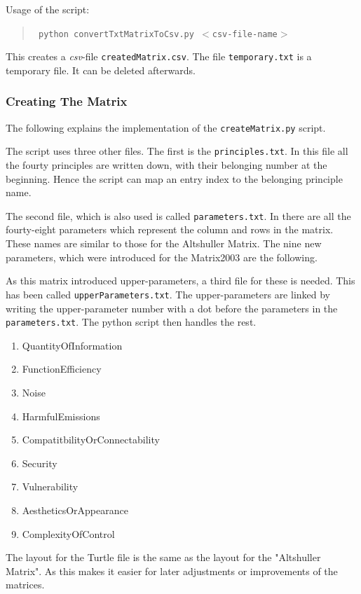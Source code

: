 \documentclass[11pt,a4paper]{article}
\begin{document}
Usage of the script: 
\begin{quote}\tt
    python convertTxtMatrixToCsv.py $<$csv-file-name$>$
\end{quote}
This creates a \emph{csv}-file \texttt{createdMatrix.csv}.  The file
\texttt{temporary.txt} is a temporary file. It can be deleted afterwards.

\subsubsection{Creating The Matrix}
\label{subsubsec:creating_matrix}

The following explains the implementation of the \texttt{createMatrix.py}
script.

The script uses three other files.  The first is the \texttt{principles.txt}.
In this file all the fourty principles are written down, with their belonging
number at the beginning.  Hence the script can map an entry index to the
belonging principle name.

The second file, which is also used is called \texttt{parameters.txt}.  In
there are all the fourty-eight parameters which represent the column and rows
in the matrix.  These names are similar to those for the Altshuller Matrix.
The nine new parameters, which were introduced for the Matrix2003 are the
following.

As this matrix introduced upper-parameters, a third file for these is needed.
This has been called \texttt{upperParameters.txt}.  The upper-parameters are
linked by writing the upper-parameter number with a dot before the parameters
in the \texttt{parameters.txt}.  The python script then handles the rest.

\begin{enumerate}
\item QuantityOfInformation
\item FunctionEfficiency
\item Noise
\item HarmfulEmissions
\item CompatitbilityOrConnectability
\item Security
\item Vulnerability
\item AestheticsOrAppearance
\item ComplexityOfControl
\end{enumerate}

The layout for the Turtle file is the same as the layout for the "Altshuller
Matrix".  As this makes it easier for later adjustments or improvements of the
matrices.
\end{document}
